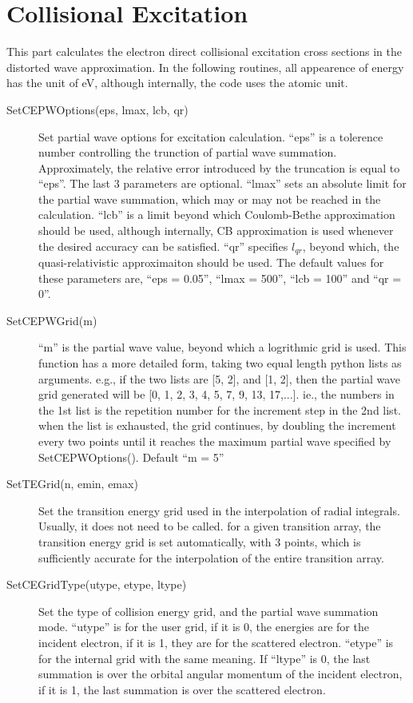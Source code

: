\documentclass[12pt]{article}
\begin{document}
\section{Collisional Excitation}
This part calculates the electron direct collisional excitation cross
sections in the distorted wave approximation. In the following routines, all
appearence of energy has the unit of eV, although internally, the code uses
the atomic unit.

\begin{description}
\item[SetCEPWOptions(eps, lmax, lcb, qr)] 
Set partial wave options for excitation calculation. 
``eps'' is a tolerence number controlling the trunction of partial wave
summation. Approximately, the relative error introduced by the truncation is
equal to ``eps''. The last 3 parameters are
optional. ``lmax'' sets an absolute limit for the partial wave 
summation, which may or may not be reached in the calculation. ``lcb'' is a
limit beyond which Coulomb-Bethe approximation should be used, although
internally, CB approximation is used whenever the desired accuracy can be
satisfied. ``qr'' specifies $l_{qr}$,
beyond which, the quasi-relativistic approximaiton should be used. The default
values for these parameters are, ``eps = 0.05'', ``lmax = 500'', ``lcb = 100''
and ``qr = 0''. 

\item[SetCEPWGrid(m)] 
``m'' is the partial wave value, beyond which a logrithmic
grid is used. This function has a more detailed form, taking two equal length
python lists as arguments. e.g., if the two lists are [5, 2], and [1, 2], then
the partial wave grid generated will be [0, 1, 2, 3, 4, 5, 7, 9, 13, 17,...].
ie., the numbers in the 1st list is the repetition number for the increment
step in the 2nd list. when the list is exhausted, the grid continues, by
doubling the increment every two points until it reaches the maximum partial
wave specified by SetCEPWOptions(). Default ``m = 5''

\item[SetTEGrid(n, emin, emax)] 
Set the transition energy grid used in the
interpolation of radial integrals. Usually, it does not need to be
called. for a given transition array, the transition energy grid is set
automatically, with 3 points, which is sufficiently accurate for the
interpolation of the entire transition array. 

\item[SetCEGridType(utype, etype, ltype)]
Set the type of collision energy grid, and the partial wave summation mode.
``utype'' is for the user grid, if it is 0, the energies are for the incident
electron, if it is 1, they are for the scattered electron. ``etype'' is for
the internal grid with the same meaning. If ``ltype'' is 0, the last summation
is over the orbital angular momentum of the incident electron, if it is 1, the
last summation is over the scattered electron. 


\end{description}
\end{document}
